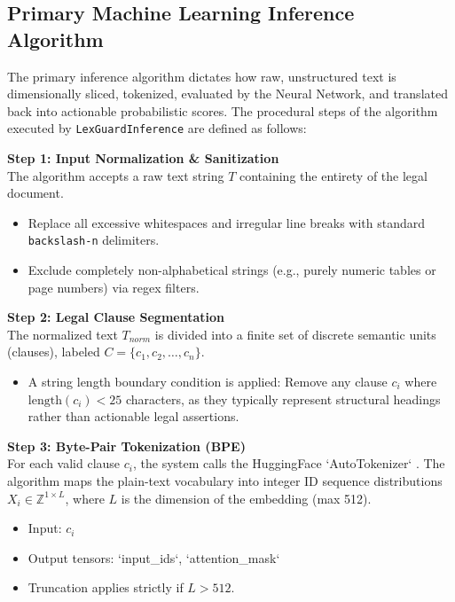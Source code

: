 \documentclass[a4paper,12pt]{report}
\begin{document}
\subsection{Primary Machine Learning Inference Algorithm}

The primary inference algorithm dictates how raw, unstructured text is dimensionally sliced, tokenized, evaluated by the Neural Network, and translated back into actionable probabilistic scores. The procedural steps of the algorithm executed by \texttt{LexGuardInference} are defined as follows:

\vspace{0.3cm}
\noindent\textbf{Step 1: Input Normalization \& Sanitization}\\
The algorithm accepts a raw text string $T$ containing the entirety of the legal document. 
\begin{itemize}
    \item Replace all excessive whitespaces and irregular line breaks with standard \texttt{backslash-n} delimiters.
    \item Exclude completely non-alphabetical strings (e.g., purely numeric tables or page numbers) via regex filters.
\end{itemize}

\noindent\textbf{Step 2: Legal Clause Segmentation}\\
The normalized text $T_{norm}$ is divided into a finite set of discrete semantic units (clauses), labeled $C = \{c_1, c_2, \dots, c_n\}$.
\begin{itemize}
    \item A string length boundary condition is applied: Remove any clause $c_i$ where $\text{length}(c_i) < 25$ characters, as they typically represent structural headings rather than actionable legal assertions.
\end{itemize}

\noindent\textbf{Step 3: Byte-Pair Tokenization (BPE)}\\
For each valid clause $c_i$, the system calls the HuggingFace `AutoTokenizer` \cite{huggingface}. The algorithm maps the plain-text vocabulary into integer ID sequence distributions $X_i \in \mathbb{Z}^{1 \times L}$, where $L$ is the dimension of the embedding (max 512).
\begin{itemize}
    \item Input: $c_i$
    \item Output tensors: `input\_ids`, `attention\_mask` 
    \item Truncation applies strictly if $L > 512$.
\end{itemize}
\end{document}
